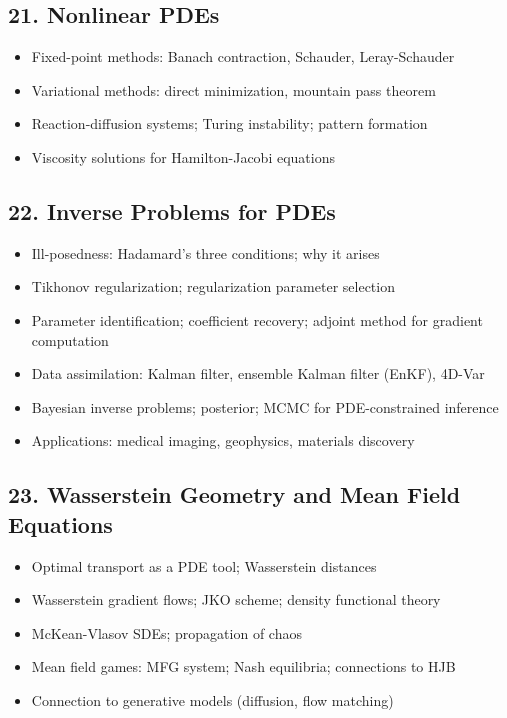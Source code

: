 \subsection{21. Nonlinear PDEs}
\begin{itemize}
\item Fixed-point methods: Banach contraction, Schauder, Leray-Schauder
\item Variational methods: direct minimization, mountain pass theorem
\item Reaction-diffusion systems; Turing instability; pattern formation
\item Viscosity solutions for Hamilton-Jacobi equations
\end{itemize}

\subsection{22. Inverse Problems for PDEs}
\begin{itemize}
\item Ill-posedness: Hadamard's three conditions; why it arises
\item Tikhonov regularization; regularization parameter selection
\item Parameter identification; coefficient recovery; adjoint method for gradient computation
\item Data assimilation: Kalman filter, ensemble Kalman filter (EnKF), 4D-Var
\item Bayesian inverse problems; posterior; MCMC for PDE-constrained inference
\item Applications: medical imaging, geophysics, materials discovery
\end{itemize}

\subsection{23. Wasserstein Geometry and Mean Field Equations}
\begin{itemize}
\item Optimal transport as a PDE tool; Wasserstein distances
\item Wasserstein gradient flows; JKO scheme; density functional theory
\item McKean-Vlasov SDEs; propagation of chaos
\item Mean field games: MFG system; Nash equilibria; connections to HJB
\item Connection to generative models (diffusion, flow matching)
\end{itemize}


